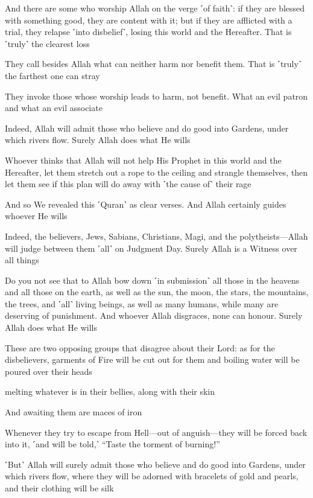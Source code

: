 And there are some who worship Allah on the verge ˹of faith˺: if they are blessed with something good, they are content with it; but if they are afflicted with a trial, they relapse ˹into disbelief˺, losing this world and the Hereafter. That is ˹truly˺ the clearest loss

They call besides Allah what can neither harm nor benefit them. That is ˹truly˺ the farthest one can stray

They invoke those whose worship leads to harm, not benefit. What an evil patron and what an evil associate

Indeed, Allah will admit those who believe and do good into Gardens, under which rivers flow. Surely Allah does what He wills

Whoever thinks that Allah will not help His Prophet in this world and the Hereafter, let them stretch out a rope to the ceiling and strangle themselves, then let them see if this plan will do away with ˹the cause of˺ their rage

And so We revealed this ˹Quran˺ as clear verses. And Allah certainly guides whoever He wills

Indeed, the believers, Jews, Sabians, Christians, Magi, and the polytheists—Allah will judge between them ˹all˺ on Judgment Day. Surely Allah is a Witness over all things

Do you not see that to Allah bow down ˹in submission˺ all those in the heavens and all those on the earth, as well as the sun, the moon, the stars, the mountains, the trees, and ˹all˺ living beings, as well as many humans, while many are deserving of punishment. And whoever Allah disgraces, none can honour. Surely Allah does what He wills

These are two opposing groups that disagree about their Lord: as for the disbelievers, garments of Fire will be cut out for them and boiling water will be poured over their heads

melting whatever is in their bellies, along with their skin

And awaiting them are maces of iron

Whenever they try to escape from Hell—out of anguish—they will be forced back into it, ˹and will be told,˺ “Taste the torment of burning!”

˹But˺ Allah will surely admit those who believe and do good into Gardens, under which rivers flow, where they will be adorned with bracelets of gold and pearls, and their clothing will be silk


